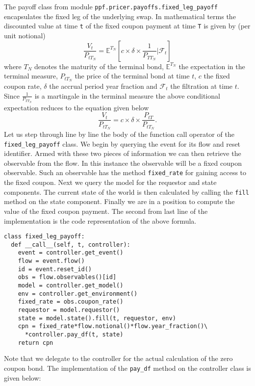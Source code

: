 The payoff class from module \verb|ppf.pricer.payoffs.fixed_leg_payoff| encapsulates 
the fixed leg of the underlying swap. In mathematical terms the discounted value at time \verb|t| of the fixed coupon payment at time \verb|T| is given by (per unit notional)
\begin{equation}
\frac{V_t}{P_{tT_{N}}} = \mathbb E^{T_N} [ c \times \delta \times  \frac{1}{P_{TT_N}} | \mathcal F_t]
\end{equation}
where $T_N$ denotes the maturity of the terminal bond, $\mathbb E^{T_N}$ the expectation in the terminal measure, $P_{tT_N}$ the price of the terminal 
bond at time $t$, $c$ the fixed coupon rate, $\delta$ the accrual period year fraction and $\mathcal F_t$ the filtration at time $t$. Since 
$\frac{1}{P_{TT_N}}$ is a martingale in the terminal measure the above conditional expectation reduces to the equation given below
\begin{equation}
\frac{V_t}{P_{tT_{N}}} = c \times \delta \times  \frac{P_{tT}}{P_{tT_N}}.
\end{equation}
Let us step through line by line the body of the function call operator of the \verb|fixed_leg_payoff| class. We begin by 
querying the event for its flow and reset identifier. Armed with these two pieces of information we can then retrieve the 
observable from the flow. In this instance the observable will be a fixed coupon observable. Such an observable has the 
method \verb|fixed_rate| for gaining access to the fixed coupon. Next we query the model for the requestor and state components. 
The current state of the world is then calculated by calling the \verb|fill| method on the state component. Finally we are in a position to compute 
the value of the fixed coupon payment. The second from last line of the implementation is the code representation of the above formula.

\begin{verbatim}
class fixed_leg_payoff:
  def __call__(self, t, controller):    
    event = controller.get_event() 
    flow = event.flow()
    id = event.reset_id()
    obs = flow.observables()[id]
    model = controller.get_model()
    env = controller.get_environment()
    fixed_rate = obs.coupon_rate()
    requestor = model.requestor()
    state = model.state().fill(t, requestor, env)
    cpn = fixed_rate*flow.notional()*flow.year_fraction()\
      *controller.pay_df(t, state)
    return cpn
\end{verbatim}

Note that we delegate to the controller for the actual calculation of the zero coupon bond. The implementation of the \verb|pay_df| method on the controller class is given below:

